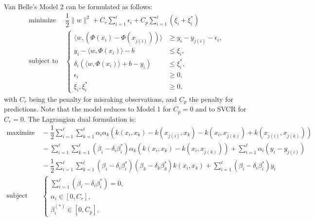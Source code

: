 \documentclass[12pt]{report}
\begin{document}
Van Belle's Model 2 can be formulated as follows:
\begin{equation} \label{model2primal}
\begin{split}
\text{minimize} &\ \dfrac{1}{2}\| w \|^2 + C_{r}\sum_{i=1}^{\ell}\epsilon_{i} + C_{p}\sum_{i=1}^{\ell}(\xi_{i} + \xi_{i}^{*}) \\
\text{subject to} &\ \begin{cases}
\langle w,(\Phi(x_{i}) - \Phi(x_{\overline{j}(i)})) \rangle &\geq y_{i} - y_{\overline{j}(i)} - \epsilon_{i} \text{,}\\
y_{i} - \langle w,\Phi(x_{i}) \rangle - b &\leq \xi_{i} \text{,}\\
\delta_{i}(\langle w,\Phi(x_{i}) \rangle + b - y_{i}) &\leq \xi_{i}^{*} \text{,}\\
\epsilon_{i} &\geq 0 \text{,}\\
\xi_{i}, \xi_{i}^{*} &\geq 0 \text{,}
\end{cases}
\end{split}
\end{equation}
with $C_{r}$ being the penalty for misraking observations, and $C_{p}$ the penalty for predictions. Note that the model reduces to Model 1 for $C_{p}=0$ and to SVCR for $C_{r}=0$.
The Lagrangian dual formulation is:
\begin{equation} \label{model2dual}
\begin{split}
\text{maximize} &\
-\dfrac{1}{2}\sum_{i=1}^{\ell}\sum_{k=1}^{\ell}\alpha_{i}\alpha_{k}(k(x_{i},x_{k})-k(x_{\overline{j}(i)},x_{k})-k(x_{i},x_{\overline{j}(k)})+k(x_{\overline{j}(i)},x_{\overline{j}(k)})) \\
&\ - \sum_{i=1}^{\ell}\sum_{k=1}^{\ell}(\beta_{i} - \delta_{i}\beta_{i}^{*})\alpha_{k}(k(x_{i},x_{k}) - k(x_{i},x_{\overline{j}(k)})) + \sum_{i=1}^{\ell}\alpha_{i}(y_{i} - y_{\overline{j}(i)}) \\
&\ - \dfrac{1}{2}\sum_{i=1}^{\ell}\sum_{k=1}^{\ell}(\beta_{i} - \delta_{i}\beta_{i}^{*})(\beta_{k} - \delta_{k}\beta_{k}^{*})k(x_{i},x_{k}) + \sum_{i=1}^{\ell}(\beta_{i} - \delta_{i}\beta_{i}^{*})y_{i}\\
\text{subject to} &\ \begin{cases}
\sum_{i=1}^{\ell}(\beta_{i} - \delta_{i}\beta_{i}^{*}) = 0 \text{,}\\
\alpha_{i} \in [0,C_{r}] \text{,}\\
\beta_{i}^{(*)} \in [0,C_{p}] \text{,}
\end{cases}
\end{split}
\end{equation}
\end{document}
